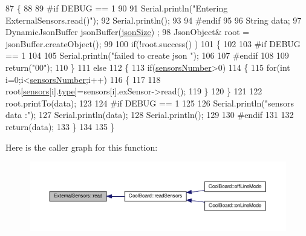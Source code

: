 \begin{DoxyCode}
87 \{
88 
89 \textcolor{preprocessor}{#if DEBUG == 1}
90 
91     Serial.println(\textcolor{stringliteral}{"Entering ExternalSensors.read()"});
92     Serial.println();
93 
94 \textcolor{preprocessor}{#endif }
95 
96     String data;
97     DynamicJsonBuffer  jsonBuffer(\hyperlink{classExternalSensors_acacea86d74d967b57fcff282d26cff57}{jsonSize}) ;
98     JsonObject& root = jsonBuffer.createObject();
99 
100     \textcolor{keywordflow}{if}(!root.success() )
101     \{
102  
103 \textcolor{preprocessor}{    #if DEBUG == 1}
104 
105         Serial.println(\textcolor{stringliteral}{"failed to create json "});
106     
107 \textcolor{preprocessor}{    #endif }
108 
109         \textcolor{keywordflow}{return}(\textcolor{stringliteral}{"00"});
110     \}
111     \textcolor{keywordflow}{else}
112     \{
113         \textcolor{keywordflow}{if}(\hyperlink{classExternalSensors_a58e4fbf9adeae787d92be5fa33043b5d}{sensorsNumber}>0)
114         \{
115             \textcolor{keywordflow}{for}(\textcolor{keywordtype}{int} i=0;i<\hyperlink{classExternalSensors_a58e4fbf9adeae787d92be5fa33043b5d}{sensorsNumber};i++)
116             \{
117             
118                 root[\hyperlink{classExternalSensors_a284233f884fcf00154a44740cf1d9e1e}{sensors}[i].\hyperlink{structExternalSensors_1_1sensor_a6acfdb02c742c2110d7bd2b5d9fce9e7}{type}]=sensors[i].exSensor->read();       
119             \}
120         \}   
121         
122         root.printTo(data);
123     
124 \textcolor{preprocessor}{    #if DEBUG == 1}
125 
126         Serial.println(\textcolor{stringliteral}{"sensors data :"});
127         Serial.println(data);
128         Serial.println();
129     
130 \textcolor{preprocessor}{    #endif}
131     
132         \textcolor{keywordflow}{return}(data);
133     \}
134 
135 \}
\end{DoxyCode}
Here is the caller graph for this function\+:\nopagebreak
\begin{figure}[H]
\begin{center}
\leavevmode
\includegraphics[width=350pt]{classExternalSensors_a53177b81eca3be89508b5511ddcd00fc_icgraph}
\end{center}
\end{figure}


